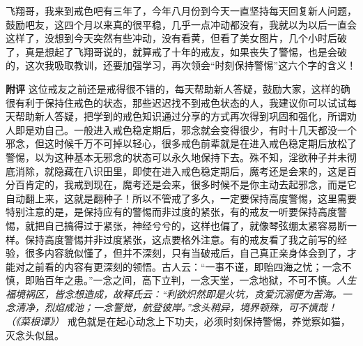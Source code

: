 \begin{case}
    飞翔哥，我来到戒色吧有三年了，今年八月份到今天一直坚持每天回复新人问题，鼓励吧友，这四个月以来真的很平稳，几乎一点冲动都没有，我就以为以后一直会这样了，没想到今天突然有些冲动，没有看黄，但看了美女图片，几个小时后破了，真是想起了飞翔哥说的，就算戒了十年的戒友，如果丧失了警惕，也是会破的，这次我吸取教训，还要加强学习，再次领会“时刻保持警惕”这六个字的含义！

    \textbf{附评} 这位戒友之前还是戒得很不错的，每天帮助新人答疑，鼓励大家，这样的确很有利于保持住戒色的状态，那些迟迟找不到戒色状态的人，我建议你可以试试每天帮助新人答疑，把学到的戒色知识通过分享的方式再次得到巩固和强化，所谓劝人即是劝自己。一般进入戒色稳定期后，邪念就会变得很少，有时十几天都没一个邪念，但这时候千万不可掉以轻心，很多戒色前辈就是在进入戒色稳定期后放松了警惕，以为这种基本无邪念的状态可以永久地保持下去。殊不知，淫欲种子并未彻底消除，就隐藏在八识田里，即使在进入戒色稳定期后，魔考还是会来的，这是百分百肯定的，我戒到现在，魔考还是会来，很多时候不是你主动去起邪念，而是它自动翻上来，这就是翻种子！所以不管戒了多久，一定要保持高度警惕，这里需要特别注意的是，是保持应有的警惕而非过度的紧张，有的戒友一听要保持高度警惕，就把自己搞得过于紧张，神经兮兮的，这样也偏了，就像琴弦绷太紧容易断一样。保持高度警惕并非过度紧张，这点要格外注意。有的戒友看了我之前写的经验，很多内容貌似懂了，但并不深刻，只有当破戒后，自己真正亲身体会到了，才能对之前看的内容有更深刻的领悟。古人云：“一事不谨，即贻四海之忧；一念不慎，即贻百年之患。”一念之间，高下立判，一念天堂，一念地狱，不可不慎。\textit{人生福境祸区，皆念想造成，故释氏云：“利欲炽然即是火坑，贪爱沉溺便为苦海。一念清净，烈焰成池；一念警觉，航登彼岸。”念头稍异，境界顿殊，可不慎哉！（《菜根谭》）} 戒色就是在起心动念上下功夫，必须时刻保持警惕，养觉察如猫，灭念头似鼠。
\end{case}

